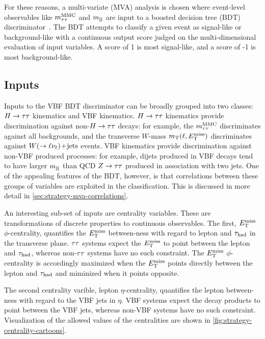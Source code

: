 For these reasons, a multi-variate (MVA) analysis is chosen where event-level observables like $m_{\tau\tau}^\text{MMC}$ and $m_{\text{jj}}$ are input to a boosted decision tree (BDT) discriminator~\cite{1984.decision-trees,2004.bdts-miniboone}. The BDT attempts to classify a given event as signal-like or background-like with a continuous output score judged on the multi-dimensional evaluation of input variables. A score of 1 is most signal-like, and a score of -1 is most background-like.

\subsection{Inputs}
\label{sec:strategy-mva-inputs}

Inputs to the VBF BDT discriminator can be broadly grouped into two classes: $H\rightarrow\tau\tau$ kinematics and VBF kinematics. $H\rightarrow\tau\tau$ kinematics provide discrimination against non-$H\rightarrow\tau\tau$ decays: for example, the $m_{\tau\tau}^\text{MMC}$ discriminates against all backgrounds, and the transverse $W$-mass $m_\text{T}(\ell, E_{\mathrm{T}}^{\mathrm{miss}})$ discriminates against $W (\rightarrow \ell\nu_\ell)\!+\!\text{jets}$ events. VBF kinematics provide discrimination against non-VBF produced processes: for example, dijets produced in VBF decays tend to have larger $m_{\text{jj}}$ than QCD $Z\rightarrow\tau\tau$ produced in association with two jets. One of the appealing features of the BDT, however, is that correlations between these groups of variables are exploited in the classification. This is discussed in more detail in \cref{sec:strategy-mva-correlations}.

An interesting sub-set of inputs are centrality variables. These are transformations of discrete properties to continuous observables. The first, $E_{\mathrm{T}}^{\mathrm{miss}}$ $\phi$-centrality, quantifies the $E_{\mathrm{T}}^{\mathrm{miss}}$ between-ness with regard to lepton and $\tau_\text{had}$ in the transverse plane. $\tau\tau$ systems expect the $E_{\mathrm{T}}^{\mathrm{miss}}$ to point between the lepton and $\tau_\text{had}$, whereas non-$\tau\tau$ systems have no such constraint. The $E_{\mathrm{T}}^{\mathrm{miss}}$ $\phi$-centrality is accordingly maximized when the $E_{\mathrm{T}}^{\mathrm{miss}}$ points directly between the lepton and $\tau_\text{had}$ and miminized when it points opposite.

The second centrality varible, lepton $\eta$-centrality, quantifies the lepton between-ness with regard to the VBF jets in $\eta$. VBF systems expect the decay products to point between the VBF jets, whereas non-VBF systems have no such constraint. Visualization of the allowed values of the centralities are shown in \cref{fig:strategy-centrality-cartoons}.

